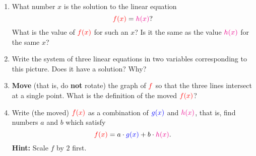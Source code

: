 \documentclass[a4paper,11pt]{article}
\newcommand{\tr}{\textcolor{red}}
\newcommand{\tb}{\textcolor{blue}}
\newcommand{\tm}{\textcolor{magenta}}
\begin{document}
\begin{enumerate}[label=(\alph*),topsep=0pt]
 \item What number $x$ is the solution to the linear equation
  \[
   \tr{f(x)} = \tm{h(x)}?
  \]
  What is the value of $\tr{f(x)}$ for such an $x$? Is it the same as the value
  $\tm{h(x)}$ for the same $x$?
 \item Write the system of three linear equations in two variables corresponding
  to this picture. Does it have a solution? Why?
 \item \textbf{Move} (that is, do \textbf{not} rotate) the graph of $\tr{f}$ so
  that the three lines intersect at a single point. What is the definition of
  the moved $\tr{f(x)}$?
 \item Write (the moved) $\tr{f(x)}$ as a combination of $\tb{g(x)}$ and
  $\tm{h(x)}$, that is, find numbers $a$ and $b$ which satisfy
  \[
   \tr{f(x)} = a \cdot \tb{g(x)} + b \cdot \tm{h(x)}.
  \]
  \textbf{Hint:} Scale $f$ by $2$ first.
\end{enumerate}
\end{document}
